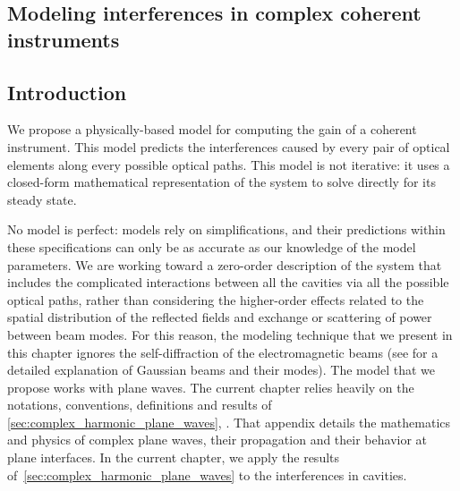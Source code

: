 \cleardoublepage
\begin{refsection}
\chapter{Modeling interferences in complex coherent instruments}
\label{sec:chapter2}

\section{Introduction}
\label{sec:chapter2_0}

We propose a physically-based model for computing the gain of a coherent instrument.
This model predicts the interferences caused by every pair of optical elements along every possible optical paths.
This model is not iterative: it uses a closed-form mathematical representation of the system to solve directly for its steady state.

No model is perfect: models rely on simplifications, and their predictions within these specifications can only be as accurate as our knowledge of the model parameters.
We are working toward a zero-order description of the system that includes the complicated interactions between all the cavities via all the possible optical paths, rather than considering the higher-order effects related to the spatial distribution of the reflected fields and exchange or scattering of power between beam modes.
For this reason, the modeling technique that we present in this chapter ignores the self-diffraction of the electromagnetic beams
(see \textcite{goldsmith1998quasioptical} for a detailed explanation of Gaussian beams and their modes).
The model that we propose works with plane waves.
The current chapter relies heavily on the notations, conventions, definitions and results of
\vref{sec:complex_harmonic_plane_waves}, \textit{}.
That appendix details the mathematics and physics of complex plane waves, their propagation and their behavior at plane interfaces.
In the current chapter, we apply the results of~\cref{sec:complex_harmonic_plane_waves} to the interferences in cavities.


\end{refsection}
